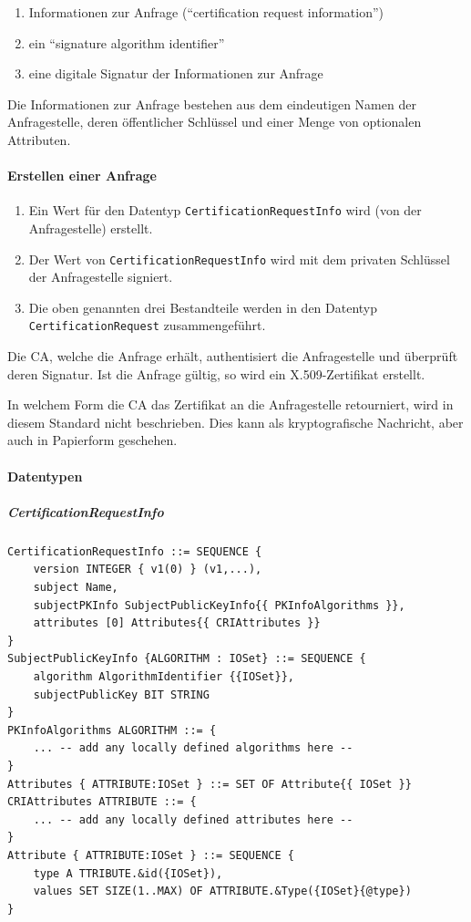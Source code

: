 \documentclass[10pt,a4paper]{article}
\begin{document}
\begin{enumerate}
    \item Informationen zur Anfrage ("`certification request information"')
    \item ein "`signature algorithm identifier"'
    \item eine digitale Signatur der Informationen zur Anfrage
\end{enumerate}

Die Informationen zur Anfrage bestehen aus dem eindeutigen Namen der Anfragestelle, deren
öffentlicher Schlüssel und einer Menge von optionalen Attributen.

\paragraph{Erstellen einer Anfrage}
\begin{enumerate}
    \item Ein Wert für den Datentyp \texttt{CertificationRequestInfo} wird (von der
        Anfragestelle) erstellt.
    \item Der Wert von \texttt{CertificationRequestInfo} wird mit dem privaten Schlüssel
        der Anfragestelle signiert.
    \item Die oben genannten drei Bestandteile werden in den Datentyp
        \texttt{CertificationRequest} zusammengeführt.
\end{enumerate}

Die CA, welche die Anfrage erhält, authentisiert die Anfragestelle und überprüft deren
Signatur. Ist die Anfrage gültig, so wird ein X.509-Zertifikat erstellt.

In welchem Form die CA das Zertifikat an die Anfragestelle retourniert, wird in diesem
Standard nicht beschrieben. Dies kann als kryptografische Nachricht, aber auch in
Papierform geschehen.

\paragraph{Datentypen}
\subparagraph{CertificationRequestInfo}
\begin{verbatim}
CertificationRequestInfo ::= SEQUENCE {
    version INTEGER { v1(0) } (v1,...),
    subject Name,
    subjectPKInfo SubjectPublicKeyInfo{{ PKInfoAlgorithms }},
    attributes [0] Attributes{{ CRIAttributes }}
}
SubjectPublicKeyInfo {ALGORITHM : IOSet} ::= SEQUENCE {
    algorithm AlgorithmIdentifier {{IOSet}},
    subjectPublicKey BIT STRING
}
PKInfoAlgorithms ALGORITHM ::= {
    ... -- add any locally defined algorithms here --
}
Attributes { ATTRIBUTE:IOSet } ::= SET OF Attribute{{ IOSet }}
CRIAttributes ATTRIBUTE ::= {
    ... -- add any locally defined attributes here --
}
Attribute { ATTRIBUTE:IOSet } ::= SEQUENCE {
    type A TTRIBUTE.&id({IOSet}),
    values SET SIZE(1..MAX) OF ATTRIBUTE.&Type({IOSet}{@type})
}
\end{verbatim}
\end{document}
